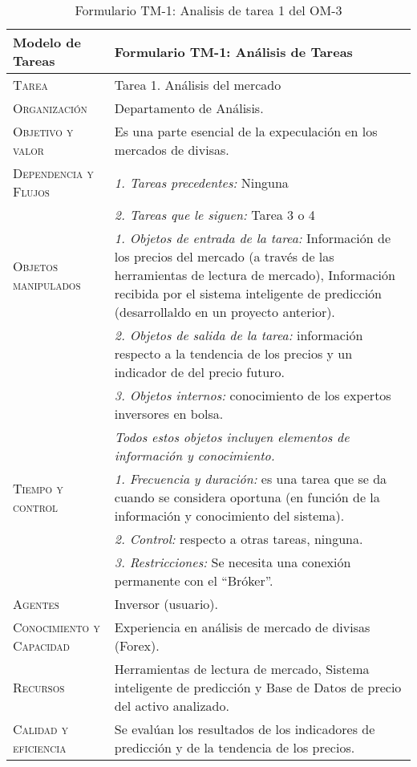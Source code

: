 \begin{table}[H]
	\scriptsize
	\begin{tabularx}{\textwidth}{|l|X|} 
		\hline
		\textbf{Modelo de Tareas} & \textbf{Formulario TM-1: Análisis de Tareas}\\ 
		\hline\hline
		\textsc{Tarea} & Tarea 1. Análisis del mercado\\ 
		\hline
		\textsc{Organización}  & Departamento de Análisis.\\ 
		\hline
		\textsc{Objetivo y valor} &  Es una parte esencial de la expeculación en los mercados de divisas.\\ 
		\hline
		\textsc{Dependencia y Flujos} & \textit{1. Tareas precedentes:} Ninguna\\ &  \textit{2. Tareas que le siguen:} Tarea 3 o 4 \\
		\hline
		\textsc{Objetos manipulados} & \textit{1. Objetos de entrada de la tarea:} Información de los precios del mercado (a través de las herramientas de lectura de mercado), Información recibida por el sistema inteligente de predicción (desarrollaldo en un proyecto anterior).\\ & \textit{2. Objetos de salida de la tarea:} información respecto a la tendencia de los precios y un indicador de del precio futuro.\\  & \textit{3. Objetos internos:} conocimiento de los  expertos inversores en bolsa. \\ & \emph{Todos estos objetos incluyen elementos de información y conocimiento.}\\
		\hline
		\textsc{Tiempo y control} & \textit{1. Frecuencia y duración:} es una tarea que se da cuando se considera  oportuna (en función de la información y conocimiento del sistema).\\ & \textit{2. Control:} respecto a otras  tareas, ninguna.\\ & \textit{3. Restricciones:} Se necesita una conexión permanente con el ``Bróker''. \\
		\hline
		\textsc{Agentes} & Inversor (usuario).\\
		\hline
		\textsc{Conocimiento y Capacidad} & Experiencia en análisis de mercado de divisas (Forex). \\
		\hline
		\textsc{Recursos} & Herramientas de lectura de mercado, Sistema inteligente de predicción y  Base de Datos de precio del activo analizado. \\
		\hline
		\textsc{Calidad y eficiencia} & Se evalúan los resultados de los indicadores de predicción y de la tendencia de los precios. \\
		\hline
	\end{tabularx}
	\caption{\label{tab:TM1T1}Formulario TM-1: Analisis de tarea 1 del OM-3}
\end{table} 


